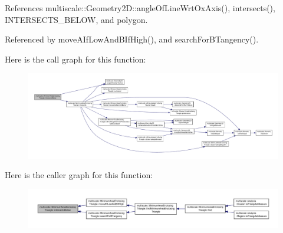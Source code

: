 References multiscale\-::\-Geometry2\-D\-::angle\-Of\-Line\-Wrt\-Ox\-Axis(), intersects(), I\-N\-T\-E\-R\-S\-E\-C\-T\-S\-\_\-\-B\-E\-L\-O\-W, and polygon.



Referenced by move\-A\-If\-Low\-And\-B\-If\-High(), and search\-For\-B\-Tangency().



Here is the call graph for this function\-:\nopagebreak
\begin{figure}[H]
\begin{center}
\leavevmode
\includegraphics[width=350pt]{classmultiscale_1_1MinimumAreaEnclosingTriangle_a9f68018fd829d176bb6de00c8e5d2291_cgraph}
\end{center}
\end{figure}




Here is the caller graph for this function\-:\nopagebreak
\begin{figure}[H]
\begin{center}
\leavevmode
\includegraphics[width=350pt]{classmultiscale_1_1MinimumAreaEnclosingTriangle_a9f68018fd829d176bb6de00c8e5d2291_icgraph}
\end{center}
\end{figure}


